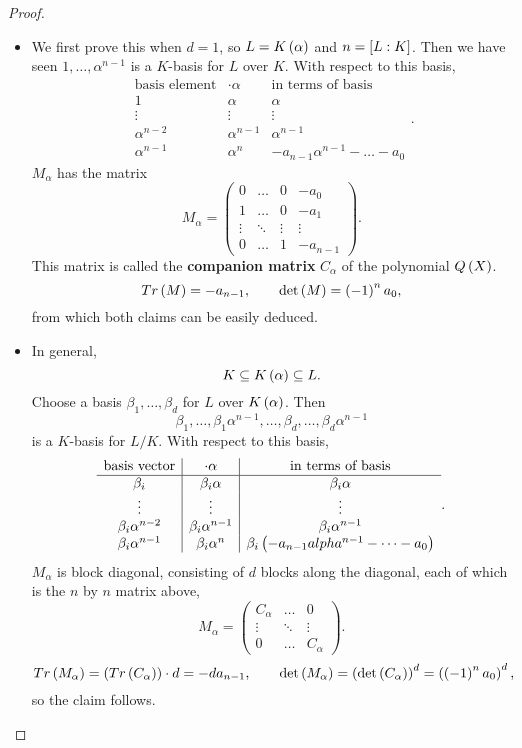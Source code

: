 \begin{proof}
\hfill
\begin{itemize}
\item We first prove this when $ d = 1 $, so $ L = K\rb{\alpha} $ and $ n = \sb{L : K} $. Then we have seen $ 1, \dots, \alpha^{n - 1} $ is a $ K $-basis for $ L $ over $ K $. With respect to this basis,
$$
\begin{array}{c|c|c}
\text{basis element} & \cdot \alpha & \text{in terms of basis} \\
\hline
1 & \alpha & \alpha \\
\vdots & \vdots & \vdots \\
\alpha^{n - 2} & \alpha^{n - 1} & \alpha^{n - 1} \\
\alpha^{n - 1} & \alpha^n & -a_{n - 1}\alpha^{n - 1} - \dots - a_0
\end{array}.
$$
$ M_\alpha $ has the matrix
$$ M_\alpha = \begin{pmatrix}
0 & \dots & 0 & -a_0 \\
1 & \dots & 0 & -a_1 \\
\vdots & \ddots & \vdots & \vdots \\
0 & \dots & 1 & -a_{n - 1}
\end{pmatrix}. $$
This matrix is called the \textbf{companion matrix} $ C_\alpha $ of the polynomial $ Q\rb{X} $.
$$ Tr\rb{M} = -a_{n - 1}, \qquad \det\rb{M} = \rb{-1}^na_0, $$
from which both claims can be easily deduced.
\item In general,
$$ K \subseteq K\rb{\alpha} \subseteq L. $$
Choose a basis $ \beta_1, \dots, \beta_d $ for $ L $ over $ K\rb{\alpha} $. Then
$$ \beta_1, \dots, \beta_1\alpha^{n - 1}, \dots, \beta_d, \dots, \beta_d\alpha^{n - 1} $$
is a $ K $-basis for $ L / K $. With respect to this basis,
$$
\begin{array}{c|c|c}
\text{basis vector} & \cdot \alpha & \text{in terms of basis} \\
\hline
\beta_i & \beta_i\alpha & \beta_i\alpha \\
\vdots & \vdots & \vdots \\
\beta_i\alpha^{n - 2} & \beta_i\alpha^{n - 1} & \beta_i\alpha^{n - 1} \\
\beta_i\alpha^{n - 1} & \beta_i\alpha^n & \beta_i\rb{-a_{n - 1}alpha^{n - 1} - \dots - a_0} \\
\end{array}.
$$
$ M_\alpha $ is block diagonal, consisting of $ d $ blocks along the diagonal, each of which is the $ n $ by $ n $ matrix above,
$$ M_\alpha = \begin{pmatrix}
C_\alpha & \dots & 0 \\
\vdots & \ddots & \vdots \\
0 & \dots & C_\alpha
\end{pmatrix}. $$
$$ Tr\rb{M_\alpha} = \rb{Tr\rb{C_\alpha}} \cdot d = -da_{n - 1}, \qquad \det\rb{M_\alpha} = \rb{\det\rb{C_\alpha}}^d = \rb{\rb{-1}^na_0}^d, $$
so the claim follows.
\end{itemize}
\end{proof}

